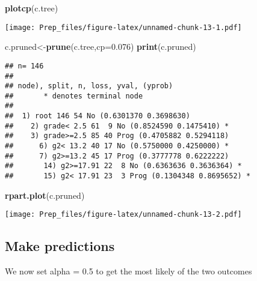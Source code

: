 \documentclass[]{article}
\newenvironment{Shaded}{\begin{snugshade}}{\end{snugshade}}
\newcommand{\CommentTok}[1]{\textcolor[rgb]{0.56,0.35,0.01}{\textit{#1}}}
\newcommand{\DataTypeTok}[1]{\textcolor[rgb]{0.13,0.29,0.53}{#1}}
\newcommand{\DecValTok}[1]{\textcolor[rgb]{0.00,0.00,0.81}{#1}}
\newcommand{\FloatTok}[1]{\textcolor[rgb]{0.00,0.00,0.81}{#1}}
\newcommand{\KeywordTok}[1]{\textcolor[rgb]{0.13,0.29,0.53}{\textbf{#1}}}
\newcommand{\NormalTok}[1]{#1}
\newcommand{\OperatorTok}[1]{\textcolor[rgb]{0.81,0.36,0.00}{\textbf{#1}}}
\newcommand{\StringTok}[1]{\textcolor[rgb]{0.31,0.60,0.02}{#1}}
\begin{document}
\begin{Shaded}
\begin{Highlighting}[]
\KeywordTok{plotcp}\NormalTok{(c.tree)}
\end{Highlighting}
\end{Shaded}

\texttt{[image: Prep\_files/figure-latex/unnamed-chunk-13-1.pdf]}

\begin{Shaded}
\begin{Highlighting}[]
\NormalTok{c.pruned<-}\KeywordTok{prune}\NormalTok{(c.tree,}\DataTypeTok{cp=}\FloatTok{0.076}\NormalTok{)}
\KeywordTok{print}\NormalTok{(c.pruned)}
\end{Highlighting}
\end{Shaded}

\begin{verbatim}
## n= 146 
## 
## node), split, n, loss, yval, (yprob)
##       * denotes terminal node
## 
##  1) root 146 54 No (0.6301370 0.3698630)  
##    2) grade< 2.5 61  9 No (0.8524590 0.1475410) *
##    3) grade>=2.5 85 40 Prog (0.4705882 0.5294118)  
##      6) g2< 13.2 40 17 No (0.5750000 0.4250000) *
##      7) g2>=13.2 45 17 Prog (0.3777778 0.6222222)  
##       14) g2>=17.91 22  8 No (0.6363636 0.3636364) *
##       15) g2< 17.91 23  3 Prog (0.1304348 0.8695652) *
\end{verbatim}

\begin{Shaded}
\begin{Highlighting}[]
\KeywordTok{rpart.plot}\NormalTok{(c.pruned)}
\end{Highlighting}
\end{Shaded}

\texttt{[image: Prep\_files/figure-latex/unnamed-chunk-13-2.pdf]}

\hypertarget{make-predictions}{%
\subsection{Make predictions}\label{make-predictions}}

We now set alpha = 0.5 to get the most likely of the two outcomes

\begin{Shaded}
\end{Shaded}
\end{document}
